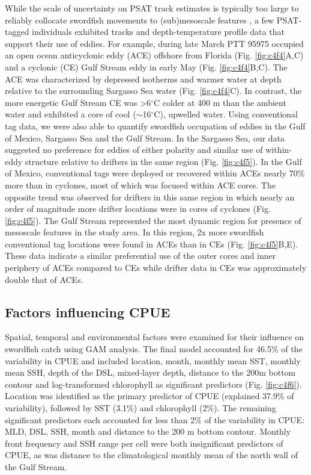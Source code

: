 While the scale of uncertainty on PSAT track estimates is typically too large to reliably collocate swordfish movements to (sub)mesoscale features \citep[$\sim$100 km;][Chp. \ref{chap:2}]{Braun2018a}, a few PSAT-tagged individuals exhibited tracks and depth-temperature profile data that support their use of eddies. For example, during late March PTT 95975 occupied an open ocean anticyclonic eddy (ACE) offshore from Florida (Fig. \ref{fig:c4f4}A,C) and a cyclonic (CE) Gulf Stream eddy in early May (Fig. \ref{fig:c4f4}B,C). The ACE was characterized by depressed isotherms and warmer water at depth relative to the surrounding Sargasso Sea water (Fig. \ref{fig:c4f4}C). In contrast, the more energetic Gulf Stream CE was >6$^{\circ}$C colder at 400 m than the ambient water and exhibited a core of cool ($\sim$16$^{\circ}$C), upwelled water. Using conventional tag data, we were also able to quantify swordfish occupation of eddies in the Gulf of Mexico, Sargasso Sea and the Gulf Stream. In the Sargasso Sea, our data suggested no preference for eddies of either polarity and similar use of within-eddy structure relative to drifters in the same region (Fig. \ref{fig:c4f5}). In the Gulf of Mexico, conventional tags were deployed or recovered within ACEs nearly 70\% more than in cyclones, most of which was focused within ACE cores. The opposite trend was observed for drifters in this same region in which nearly an order of magnitude more drifter locations were in cores of cyclones (Fig. \ref{fig:c4f5}). The Gulf Stream represented the most dynamic region for presence of mesoscale features in the study area. In this region, 2x more swordfish conventional tag locations were found in ACEs than in CEs (Fig. \ref{fig:c4f5}B,E). These data indicate a similar preferential use of the outer cores and inner periphery of ACEs compared to CEs while drifter data in CEs was approximately double that of ACEs.

\subsection{Factors influencing CPUE}

Spatial, temporal and environmental factors were examined for their influence on swordfish catch using GAM analysis. The final model accounted for 46.5\% of the variability in CPUE and included location, month, monthly mean SST, monthly mean SSH, depth of the DSL, mixed-layer depth, distance to the 200m bottom contour and log-transformed chlorophyll as significant predictors (Fig. \ref{fig:c4f6}). Location was identified as the primary predictor of CPUE (explained 37.9\% of variability), followed by SST (3.1\%) and chlorophyll (2\%). The remaining significant predictors each accounted for less than 2\% of the variability in CPUE: MLD, DSL, SSH, month and distance to the 200 m bottom contour. Monthly front frequency and SSH range per cell were both insignificant predictors of CPUE, as was distance to the climatological monthly mean of the north wall of the Gulf Stream.

